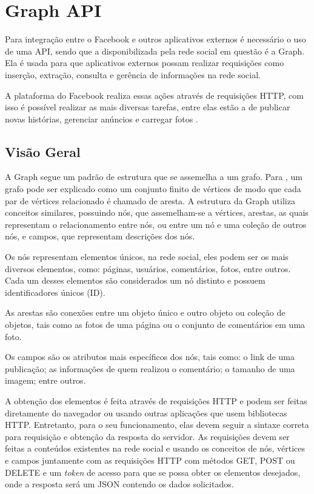 \chapter[Graph API]{Graph API}
\label{cap:api}
Para integração entre o Facebook e outros aplicativos externos é necessário o uso de uma API, sendo que a disponibilizada pela rede social em questão é a Graph. Ela é usada para que aplicativos externos possam realizar requisições como inserção,  extração, consulta e gerência de informações na rede social. 

A plataforma do Facebook realiza essas ações através de requisições HTTP, com isso é possível realizar as mais diversas tarefas, entre elas estão a de publicar novas histórias, gerenciar anúncios e carregar fotos \cite{facebook2018b}.

\section{Visão Geral}
A Graph segue um padrão de estrutura que se assemelha a um grafo. Para \cite{soares2014}, um grafo pode ser explicado como um conjunto finito de vértices de modo que cada par de vértices relacionado é chamado de aresta. A estrutura da Graph utiliza conceitos similares, possuindo nós, que assemelham-se a vértices, arestas, as quais representam o relacionamento entre nós, ou entre um nó e uma coleção de outros nós, e campos, que representam descrições dos nós.

Os nós representam elementos únicos, na rede social, eles podem ser os mais diversos elementos, como: páginas, usuários, comentários, fotos, entre outros. Cada um desses elementos são considerados um nó distinto \cite{facebook2018b} e possuem identificadores únicos (ID). 

As arestas são conexões entre um objeto único e outro objeto ou  coleção de objetos, tais como as fotos de uma página ou o conjunto de comentários em uma foto. 

Os campos são os atributos mais específicos dos nós, tais como: o link de uma publicação; as informações de quem realizou o comentário; o tamanho de uma imagem; entre outros.

A obtenção dos elementos é feita através de requisições HTTP e podem ser feitas diretamente do navegador ou usando outras aplicações que usem bibliotecas HTTP. Entretanto, para o seu funcionamento, elas devem seguir a sintaxe correta para requisição e obtenção da resposta do servidor. 
As requisições devem ser feitas a conteúdos existentes na rede social e usando os conceitos de nós, vértices e campos juntamente com as requisições HTTP com métodos GET, POST ou DELETE e um \textit{token} de acesso para que se possa obter os elementos desejados, onde a resposta será um JSON contendo os dados solicitados.


